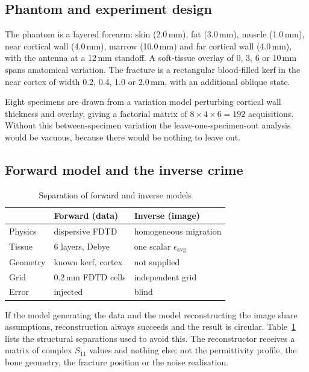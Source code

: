 \documentclass[conference]{IEEEtran}
\begin{document}
\subsection{Phantom and experiment design}
The phantom is a layered forearm: skin (2.0\,mm), fat (3.0\,mm), muscle
(1.0\,mm), near cortical wall (4.0\,mm), marrow (10.0\,mm) and far cortical
wall (4.0\,mm), with the antenna at a 12\,mm standoff. A soft-tissue overlay
of 0, 3, 6 or 10\,mm spans anatomical variation. The fracture is a
rectangular blood-filled kerf in the near cortex of width 0.2, 0.4, 1.0 or
2.0\,mm, with an additional oblique state.

Eight specimens are drawn from a variation model perturbing cortical wall
thickness and overlay, giving a factorial matrix of
$8 \times 4 \times 6 = 192$ acquisitions. Without this between-specimen
variation the leave-one-specimen-out analysis would be vacuous, because
there would be nothing to leave out.

\subsection{Forward model and the inverse crime}

\begin{table}[t]
\caption{Separation of forward and inverse models}
\label{tab:crime}
\centering
\footnotesize
\begin{tabular}{@{}lll@{}}
\toprule
 & \textbf{Forward (data)} & \textbf{Inverse (image)} \\
\midrule
Physics & dispersive FDTD & homogeneous migration \\
Tissue & 6 layers, Debye & one scalar $\epsilon_{\mathrm{avg}}$ \\
Geometry & known kerf, cortex & not supplied \\
Grid & 0.2\,mm FDTD cells & independent grid \\
Error & injected & blind \\
\bottomrule
\end{tabular}
\end{table}

If the model generating the data and the model reconstructing the image
share assumptions, reconstruction always succeeds and the result is
circular. Table~\ref{tab:crime} lists the structural separations used to
avoid this. The reconstructor receives a matrix of complex $S_{11}$ values
and nothing else: not the permittivity profile, the bone geometry, the
fracture position or the noise realisation.
\end{document}
